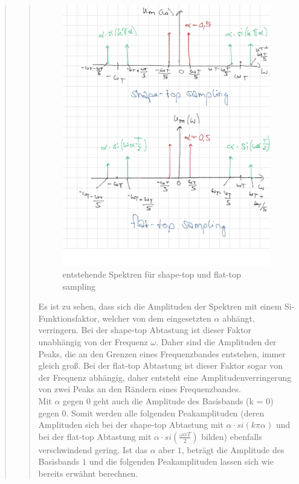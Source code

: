 \begin{quote}
\begin{quote}
         \begin{figure}[H]
            \centering
                \includegraphics[scale=0.3, trim = 0cm 0cm 0cm 0cm,
                clip]{./Bilder/vorbereitungsskizze}
                    \caption{entstehende Spektren für shape-top und flat-top
                    sampling}
        \end{figure}
        
        Es ist zu sehen, dass sich die Amplituden der Spektren mit einem
        Si-Funktionsfaktor, welcher von dem eingesetzten $\alpha$ abhängt, verringern.
        Bei der shape-top Abtastung ist dieser Faktor unabhängig von der Frequenz
        $\omega$. Daher sind die Amplituden der Peaks, die an den Grenzen eines
        Frequenzbandes entstehen, immer gleich groß.        
        Bei der flat-top Abtastung ist dieser Faktor sogar von der Frequenz abhängig, daher entsteht 
        eine Amplitudenverringerung von zwei Peaks an den Rändern eines
        Frequenzbandes.\\
        Mit $\alpha$ gegen $0$ geht auch die Amplitude des Basisbands (k = $0$) gegen
        $0$. Somit werden alle folgenden Peakamplituden (deren Amplituden sich bei der
        shape-top Abtastung mit $\alpha \cdot si(k \pi \alpha)$ und bei der flat-top
        Abtastung mit $\alpha \cdot si(\frac{\omega \alpha T}{2})$ bilden) ebenfalls
        verschwindend gering. Ist das $\alpha$ aber $1$, beträgt die Amplitude des
        Basisbands $1$ und die folgenden Peakamplituden lassen sich wie bereits
        erwähnt berechnen.\\
        

\end{quote}
\end{quote}
